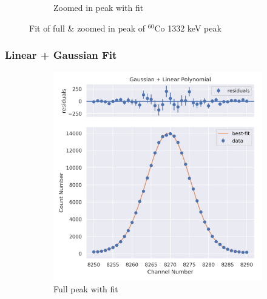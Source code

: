 \documentclass[11pt,a4paper]{article}
\newcommand{\element}[2]{$^{#2}\textrm{#1}$}
\begin{document}
\begin{figure}[H]
\begin{subfigure}{.5\linewidth}
    \caption{Zoomed in peak with fit}
  \end{subfigure}
  \caption{Fit of full \& zoomed in peak of \element{Co}{60} 1332 keV peak}
\end{figure}
\clearpage
\subsubsection{Linear + Gaussian Fit}
\begin{figure}[H]
  \centering
  \begin{subfigure}{.5\linewidth}
    \centering
    \includegraphics[width=\linewidth]{./Images/Cobalt60/Linear/Linear_1_Full.png}
    \caption{Full peak with fit}
  \end{subfigure}%
  \begin{subfigure}{.5\linewidth}
    \centering

\end{subfigure}
\end{figure}
\end{document}
